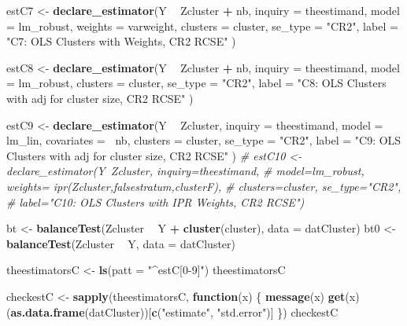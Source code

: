 \documentclass[
  12pt,
]{book}
\newenvironment{Shaded}{\begin{snugshade}}{\end{snugshade}}
\newcommand{\CommentTok}[1]{\textcolor[rgb]{0.56,0.35,0.01}{\textit{#1}}}
\newcommand{\ControlFlowTok}[1]{\textcolor[rgb]{0.13,0.29,0.53}{\textbf{#1}}}
\newcommand{\DataTypeTok}[1]{\textcolor[rgb]{0.13,0.29,0.53}{#1}}
\newcommand{\KeywordTok}[1]{\textcolor[rgb]{0.13,0.29,0.53}{\textbf{#1}}}
\newcommand{\NormalTok}[1]{#1}
\newcommand{\OperatorTok}[1]{\textcolor[rgb]{0.81,0.36,0.00}{\textbf{#1}}}
\newcommand{\StringTok}[1]{\textcolor[rgb]{0.31,0.60,0.02}{#1}}
\theoremstyle{definition}
\theoremstyle{definition}
\theoremstyle{definition}
\theoremstyle{remark}
\begin{document}
\begin{Shaded}
\begin{Highlighting}[]
\NormalTok{estC7 <-}\StringTok{ }\KeywordTok{declare_estimator}\NormalTok{(Y }\OperatorTok{~}\StringTok{ }\NormalTok{Zcluster }\OperatorTok{+}\StringTok{ }\NormalTok{nb,}
  \DataTypeTok{inquiry =}\NormalTok{ theestimand,}
  \DataTypeTok{model =}\NormalTok{ lm_robust, }\DataTypeTok{weights =}\NormalTok{ varweight,}
  \DataTypeTok{clusters =}\NormalTok{ cluster, }\DataTypeTok{se_type =} \StringTok{"CR2"}\NormalTok{,}
  \DataTypeTok{label =} \StringTok{"C7: OLS Clusters with Weights, CR2 RCSE"}
\NormalTok{)}

\NormalTok{estC8 <-}\StringTok{ }\KeywordTok{declare_estimator}\NormalTok{(Y }\OperatorTok{~}\StringTok{ }\NormalTok{Zcluster }\OperatorTok{+}\StringTok{ }\NormalTok{nb,}
  \DataTypeTok{inquiry =}\NormalTok{ theestimand,}
  \DataTypeTok{model =}\NormalTok{ lm_robust,}
  \DataTypeTok{clusters =}\NormalTok{ cluster, }\DataTypeTok{se_type =} \StringTok{"CR2"}\NormalTok{,}
  \DataTypeTok{label =} \StringTok{"C8: OLS Clusters with adj for cluster size, CR2 RCSE"}
\NormalTok{)}

\NormalTok{estC9 <-}\StringTok{ }\KeywordTok{declare_estimator}\NormalTok{(Y }\OperatorTok{~}\StringTok{ }\NormalTok{Zcluster,}
  \DataTypeTok{inquiry =}\NormalTok{ theestimand,}
  \DataTypeTok{model =}\NormalTok{ lm_lin, }\DataTypeTok{covariates =} \OperatorTok{~}\NormalTok{nb,}
  \DataTypeTok{clusters =}\NormalTok{ cluster, }\DataTypeTok{se_type =} \StringTok{"CR2"}\NormalTok{,}
  \DataTypeTok{label =} \StringTok{"C9: OLS Clusters with adj for cluster size, CR2 RCSE"}
\NormalTok{)}
\CommentTok{# estC10 <- declare_estimator(Y~Zcluster, inquiry=theestimand,}
\CommentTok{#              model=lm_robust, weights= ipr(Zcluster,falsestratum,clusterF),}
\CommentTok{#              clusters=cluster, se_type="CR2",}
\CommentTok{#              label="C10: OLS Clusters with IPR Weights, CR2 RCSE")}


\NormalTok{bt <-}\StringTok{ }\KeywordTok{balanceTest}\NormalTok{(Zcluster }\OperatorTok{~}\StringTok{ }\NormalTok{Y }\OperatorTok{+}\StringTok{ }\KeywordTok{cluster}\NormalTok{(cluster), }\DataTypeTok{data =}\NormalTok{ datCluster)}
\NormalTok{bt0 <-}\StringTok{ }\KeywordTok{balanceTest}\NormalTok{(Zcluster }\OperatorTok{~}\StringTok{ }\NormalTok{Y, }\DataTypeTok{data =}\NormalTok{ datCluster)}

\NormalTok{theestimatorsC <-}\StringTok{ }\KeywordTok{ls}\NormalTok{(}\DataTypeTok{patt =} \StringTok{"^estC[0-9]"}\NormalTok{)}
\NormalTok{theestimatorsC}

\NormalTok{checkestC <-}\StringTok{ }\KeywordTok{sapply}\NormalTok{(theestimatorsC, }\ControlFlowTok{function}\NormalTok{(x) \{}
  \KeywordTok{message}\NormalTok{(x)}
  \KeywordTok{get}\NormalTok{(x)(}\KeywordTok{as.data.frame}\NormalTok{(datCluster))[}\KeywordTok{c}\NormalTok{(}\StringTok{"estimate"}\NormalTok{, }\StringTok{"std.error"}\NormalTok{)]}
\NormalTok{\})}
\NormalTok{checkestC}


\end{Highlighting}
\end{Shaded}
\end{document}
